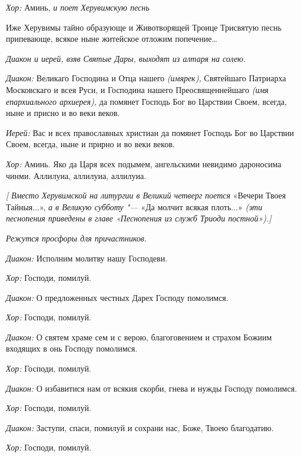 \begin{mymulticols}
{\itshape Хор:} Аминь, {\itshape и поет Херувимскую песнь }


Иже Херувимы тайно образующе и Животворящей Троице Трисвятую песнь припевающе, всякое ныне житейское отложим попечение… 


{\itshape Диакон и иерей, взяв Святые Дары, выходят из алтаря на солею.}

{\itshape Диакон:} Великаго Господина и Отца нашего  {\itshape (имярек),} Святейшаго Патриарха Московскаго и всея Руси, и Господина нашего Преосвященнейшаго {\itshape (имя епархиального архиерея),} да помянет Господь Бог во Царствии Своем, всегда, ныне и присно и во веки веков.

{\itshape Иерей:} Вас и всех православных христиан да помянет Господь Бог во Царствии Своем, всегда, ныне и прирно и во веки веков.

{\itshape Хор:} Аминь. Яко да Царя всех подымем, ангельскими невидимо дароносима чинми. Аллилуиа, аллилуиа, аллилуиа.

{\itshape [ Вместо Херувимской на литургии в Великий четверг поется }«Вечери Твоея Тайныя...», {\itshape а в Великую субботу "--- }«Да молчит всякая плоть...» {\itshape (эти песнопения приведены в главе «Песнопения из служб Триоди постной»).]}

{\itshape Режутся просфоры для причастников}. 


{\itshape Диакон:} Исполним молитву нашу Господеви. 

{\itshape Хор:} Господи, помилуй.

{\itshape Диакон:} О предложенных честных Дарех Господу помолимся. 

{\itshape Хор:} Господи, помилуй.

{\itshape Диакон:} О святем храме сем и с верою, благоговением и страхом Божиим входящих в онь Господу помолимся. 

{\itshape Хор:} Господи, помилуй.

{\itshape Диакон:} О избавитися нам от всякия скорби, гнева и нужды Господу помолимся. 

{\itshape Хор:} Господи, помилуй.

{\itshape Диакон:} Заступи, спаси, помилуй и сохрани нас, Боже, Твоею благодатию. 

{\itshape Хор:} Господи, помилуй.


\end{mymulticols}
